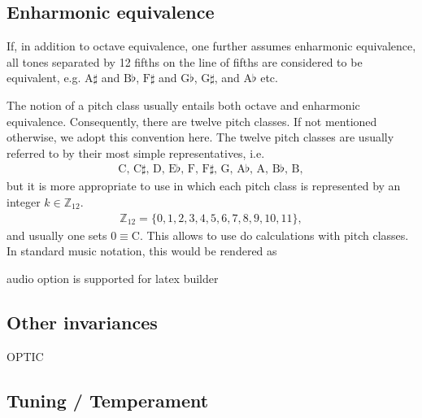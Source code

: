 \documentclass[letterpaper,10pt,english]{sphinxmanual}
\begin{document}
\subsection{Enharmonic equivalence}
\label{\detokenize{1_fundamentals:enharmonic-equivalence}}
\sphinxAtStartPar
If, in addition to octave equivalence, one further assumes enharmonic equivalence,
all tones separated by 12 fifths on the line of fifths
are considered to be equivalent, e.g. \(\text{A}\sharp\) and \(\text{B}\flat\),
\(\text{F}\sharp\) and \(\text{G}\flat\), \(\text{G}\sharp\), and \(\text{A}\flat\) etc.

\sphinxAtStartPar
The notion of a pitch class usually entails both octave and enharmonic equivalence.
Consequently, there are twelve pitch classes. If not mentioned otherwise, we adopt this convention here.
The twelve pitch classes are usually referred to by their most simple representatives, i.e.
\begin{equation*}
\begin{split}\text{C, C$\sharp$, D, E$\flat$, F, F$\sharp$, G, A$\flat$, A, B$\flat$, B},\end{split}
\end{equation*}
\sphinxAtStartPar
but it is more appropriate to use  in which each pitch class is represented
by an integer \(k \in \mathbb{Z}_{12}\).
\begin{equation*}
\begin{split}\mathbb{Z}_{12}=\{0, 1, 2, 3, 4, 5, 6, 7, 8, 9, 10, 11\},\end{split}
\end{equation*}
\sphinxAtStartPar
and usually one sets \(0\equiv \text{C}\). This allows to use 
do calculations with pitch classes. In standard music notation, this would be rendered as

\noindent{}

\sphinxAtStartPar
audio option is supported for latex builder



\subsection{Other invariances}
\label{\detokenize{1_fundamentals:other-invariances}}
\sphinxAtStartPar
OPTIC


\subsection{Tuning / Temperament}
\label{\detokenize{1_fundamentals:tuning-temperament}}
\end{document}
